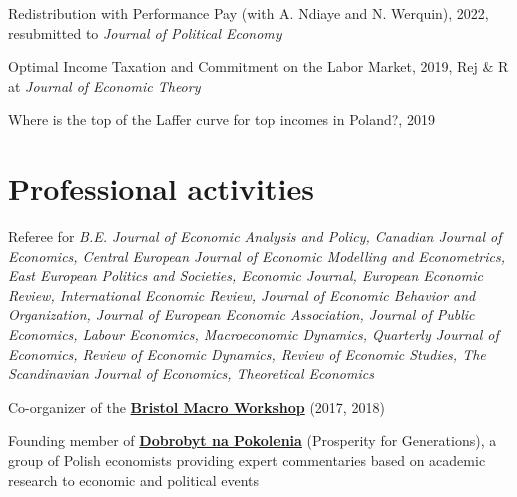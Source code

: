 \documentclass[letterpaper]{article}
\renewenvironment{itemize}{
  \begin{list}{}{
    \setlength{\leftmargin}{1.5em}
  }
}{
  \end{list}
}
\begin{document}
\begin{itemize}
\item Redistribution with Performance Pay (with A. Ndiaye and N. Werquin), 2022, resubmitted to \textit{Journal of Political Economy}
\item Optimal Income Taxation and Commitment on the Labor Market, 2019, Rej \& R at \textit{Journal of Economic Theory}
\item Where is the top of the Laffer curve for top incomes in Poland?, 2019
\end{itemize}



\section*{Professional activities}
\begin{itemize}
\item Referee for \textit{B.E. Journal of Economic Analysis and Policy, Canadian Journal of Economics, Central European Journal of Economic Modelling and Econometrics, East European Politics and Societies, Economic Journal, European Economic Review, International Economic Review, Journal of Economic Behavior and Organization, Journal of European Economic Association, Journal of Public Economics, Labour Economics, Macroeconomic Dynamics, Quarterly Journal of Economics, Review of Economic Dynamics, Review of Economic Studies, The Scandinavian Journal of Economics, Theoretical Economics}

\item Co-organizer of the \href{http://pdoligalski.github.io/BristolMacro/index.html}{\textbf{Bristol Macro Workshop}} (2017, 2018)
\item Founding member of \href{https://napokolenia.pl}{\textbf{Dobrobyt na Pokolenia}} (Prosperity for Generations), a group of Polish economists providing expert commentaries based on academic research to economic and political events 
\end{itemize}
\end{document}
